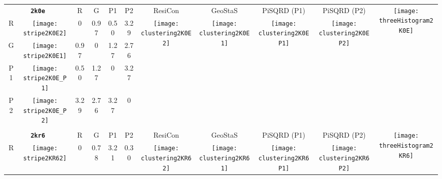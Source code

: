 \documentclass[a4paper,11pt,twoside]{book}%
\begin{document}
\begin{appendices}
\begin{sidewaystable}[h!]
\sffamily
\begin{tabular*}{4cm}{cc|c|c|c|c|c|c|c|c|c|}
\cline{1-11}
\multicolumn{2}{|c|}{{\bf \texttt{2k0e}}} & R & G & P1 & P2 & ResiCon & GeoStaS & PiSQRD (P1) & PiSQRD (P2) & \multirow{5}{*}{\vspace{-0.15cm}\texttt{[image: threeHistogram2K0E]}}  \\
\cline{1-10}
\multicolumn{1}{|c|}{R} & \texttt{[image: stripe2K0E2]} & 0 & 0.97 & 0.50 & 3.29 & \multirow{4}{*}{\vspace{-0.3cm}\texttt{[image: clustering2K0E2]}} & \multirow{4}{*}{\vspace{-0.3cm}\texttt{[image: clustering2K0E1]}} & \multirow{4}{*}{\vspace{-0.3cm}\texttt{[image: clustering2K0EP1]}} & \multirow{4}{*}{\vspace{-0.3cm}\texttt{[image: clustering2K0EP2]}} &  \multirow{5}{*}{} \\
\cline{1-6}
\multicolumn{1}{|c|}{G} & \texttt{[image: stripe2K0E1]} & 0.97 & 0 & 1.27 & 2.76 & \multirow{4}{*}{} & \multirow{4}{*}{} & \multirow{4}{*}{} & \multirow{4}{*}{} & \multirow{5}{*}{} \\
\cline{1-6}
\multicolumn{1}{|c|}{P1} & \texttt{[image: stripe2K0E\_P1]} & 0.50 & 1.27 & 0 & 3.27 & \multirow{4}{*}{} & \multirow{4}{*}{} & \multirow{4}{*}{} & \multirow{4}{*}{} & \multirow{5}{*}{}  \\
\cline{1-6}
\multicolumn{1}{|c|}{P2} & \texttt{[image: stripe2K0E\_P2]} & 3.29 & 2.76 & 3.27 & 0 & \multirow{4}{*}{} & \multirow{4}{*}{} & \multirow{4}{*}{} & \multirow{4}{*}{} & \multirow{5}{*}{}  \\
\cline{1-11}
\\
\cline{1-11}
\multicolumn{2}{|c|}{{\bf \texttt{2kr6}}} & R & G & P1 & P2 & ResiCon & GeoStaS & PiSQRD (P1) & PiSQRD (P2) & \multirow{5}{*}{\vspace{-0.15cm}\texttt{[image: threeHistogram2KR6]}}  \\
\cline{1-10}
\multicolumn{1}{|c|}{R} & \texttt{[image: stripe2KR62]} & 0 & 0.78 & 3.21 & 0.30 & \multirow{4}{*}{\vspace{-0.3cm}\texttt{[image: clustering2KR62]}} & \multirow{4}{*}{\vspace{-0.3cm}\texttt{[image: clustering2KR61]}} & \multirow{4}{*}{\vspace{-0.3cm}\texttt{[image: clustering2KR6P1]}} & \multirow{4}{*}{\vspace{-0.3cm}\texttt{[image: clustering2KR6P2]}} &  \multirow{5}{*}{} \\

\end{tabular*}
\end{sidewaystable}
\end{appendices}
\end{document}
